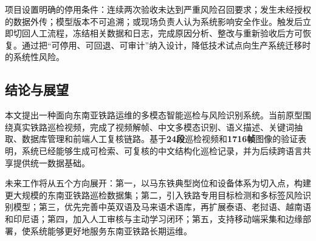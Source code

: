 \documentclass[UTF8,a4paper,zihao=-4]{ctexart}
\newcommand{\keynum}[1]{\textcolor{railred}{\bfseries #1}}
\begin{document}
项目设置明确的停用条件：连续两次验收未达到严重风险召回要求；发生未经授权的数据外传；模型版本不可追溯；或现场负责人认为系统影响安全作业。触发后立即切回人工流程，冻结相关数据和日志，完成原因分析、整改与重新验收后方可恢复。通过把“可停用、可回退、可审计”纳入设计，降低技术试点向生产系统迁移时的系统性风险。

\subsection{结论与展望}

本文提出一种面向东南亚铁路运维的多模态智能巡检与风险识别系统。当前原型围绕真实铁路巡检视频，完成了视频解帧、中文多模态识别、语义描述、关键词抽取、数据库管理和前端人工复核链路。基于\keynum{24段}巡检视频和\keynum{1716帧}图像的验证表明，系统已经能够生成可检索、可复核的中文结构化巡检记录，并为后续跨语言共享提供统一数据基础。

未来工作将从五个方向展开：第一，以马东铁典型岗位和设备体系为切入点，构建更大规模的东南亚铁路巡检数据集；第二，引入铁路专用目标检测和多标签风险识别模型；第三，优先完善中英双语及马来语术语库，再扩展泰语、老挝语、越南语和印尼语；第四，加入人工审核与主动学习闭环；第五，支持移动端采集和边缘部署，使系统能够更好地服务东南亚铁路长期运维。
\end{document}
